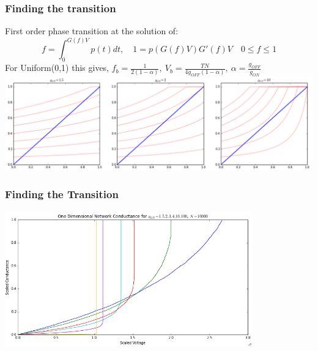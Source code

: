 \documentclass[mathserif]{beamer}
\begin{document}
\begin{frame}
\frametitle{Finding the transition}
First order phase transition at the solution of:
$$f = \int_0^{G(f)V} p(t) dt,  \quad 1 = p(G(f)V)G'(f)V \quad 0 \le f \le 1$$
For Uniform(0,1) this gives, 
$f_b = \frac{1}{2(1-\alpha)}, \: V_b = \frac{TN}{4g_{OFF}(1-\alpha)},
 \: \alpha = \frac{g_{OFF}}{g_{ON}}$
\centering
\includegraphics[width=\textwidth]{SC_1D_Uniform01.png}
\end{frame}

\begin{frame}
\frametitle{Finding the Transition}
\centering
\includegraphics[width=0.8\textwidth]{1D_Cond.png}

\end{frame}
\end{document}
